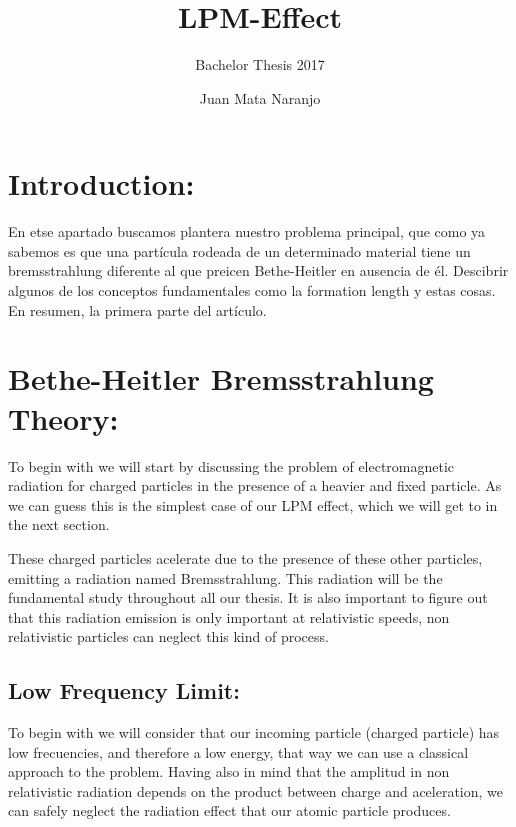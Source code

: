 \documentclass{article}
\begin{document}
\marginsize{3cm}{2cm}{3cm}{3cm}
\setlength{\parindent}{1cm}

\title{LPM-Effect}

\author{Bachelor Thesis 2017}
\date{Juan Mata Naranjo}

\maketitle
\tableofcontents

\newpage

\section{Introduction:}

En etse apartado buscamos plantera nuestro problema principal, que como ya sabemos es que una partícula rodeada de un determinado material tiene un bremsstrahlung diferente al que preicen Bethe-Heitler en ausencia de él. Descibrir algunos de los conceptos fundamentales como la formation length y estas cosas. En resumen, la primera parte del artículo.

\section{Bethe-Heitler Bremsstrahlung Theory:}

To begin with we will start by discussing the problem of electromagnetic radiation for charged particles in the presence of a heavier and fixed particle. As we can guess this is the simplest case of our LPM effect, which we will get to in the next section. 

These charged particles acelerate due to the presence of these other particles, emitting a radiation named Bremsstrahlung. This radiation will be the fundamental study throughout all our thesis. It is also important to figure out that this radiation emission is only important at relativistic speeds, non relativistic particles can neglect this kind of process. 

\subsection{Low Frequency Limit:}

To begin with we will consider that our incoming particle (charged particle) has low frecuencies, and therefore a low energy, that way we can use a classical approach to the problem. Having also in mind that the amplitud in non relativistic radiation depends on the product between charge and aceleration, we can safely neglect the radiation effect that our atomic particle produces. 
\end{document}
